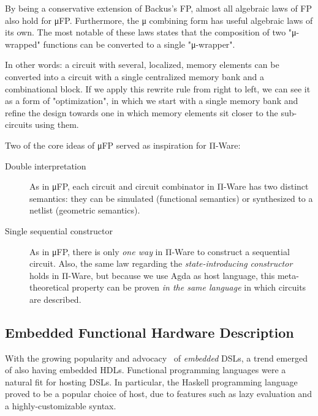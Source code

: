         By being a conservative extension of Backus's FP, almost all algebraic laws of FP also hold for μFP.
        Furthermore, the μ combining form has useful algebraic laws of its own.
        The most notable of these laws states that the composition of two "μ-wrapped" functions
        can be converted to a single "μ-wrapper".

        In other words: a circuit with several, localized, memory elements can be converted into a circuit
        with a single centralized memory bank and a combinational block.
        If we apply this rewrite rule from right to left, we can see it as a form of "optimization",
        in which we start with a single memory bank and refine the design towards one in which
        memory elements sit closer to the sub-circuits using them.

        Two of the core ideas of μFP served as inspiration for Π-Ware:

        \begin{description}
            \item[Double interpretation] As in μFP,
                each circuit and circuit combinator in Π-Ware has two distinct semantics:
                they can be simulated (functional semantics) or synthesized to a netlist (geometric semantics).
            \item[Single sequential constructor] As in μFP,
                there is only \emph{one way} in Π-Ware to construct a sequential circuit.
                Also, the same law regarding the \emph{state-introducing constructor} holds in Π-Ware,
                but because we use Agda as host language, this meta-theoretical property can be proven
                \emph{in the same language} in which circuits are described.
        \end{description}


        \subsection{Embedded Functional Hardware Description}
        \label{subsec:embedded-functional-hardware}
            With the growing popularity and advocacy~\cite{hudak-edsls} of \emph{embedded} \acp{DSL},
            a trend emerged of also having embedded \acp{HDL}.
            Functional programming languages were a natural fit for hosting \acp{DSL}.
            In particular, the Haskell programming language proved to be a popular choice of host,
            due to features such as lazy evaluation and a highly-customizable syntax.

